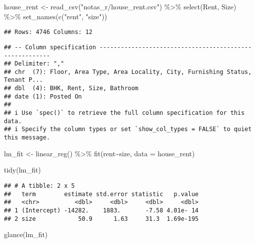 \documentclass[
]{article}
\newenvironment{Shaded}{\begin{snugshade}}{\end{snugshade}}
\newcommand{\AttributeTok}[1]{\textcolor[rgb]{0.77,0.63,0.00}{#1}}
\newcommand{\FunctionTok}[1]{\textcolor[rgb]{0.00,0.00,0.00}{#1}}
\newcommand{\NormalTok}[1]{#1}
\newcommand{\OtherTok}[1]{\textcolor[rgb]{0.56,0.35,0.01}{#1}}
\newcommand{\SpecialCharTok}[1]{\textcolor[rgb]{0.00,0.00,0.00}{#1}}
\newcommand{\StringTok}[1]{\textcolor[rgb]{0.31,0.60,0.02}{#1}}
\begin{document}
\begin{Shaded}
\begin{Highlighting}[]
\NormalTok{house\_rent }\OtherTok{\textless{}{-}} 
  \FunctionTok{read\_csv}\NormalTok{(}\StringTok{"notas\_r/house\_rent.csv"}\NormalTok{) }\SpecialCharTok{\%\textgreater{}\%} 
  \FunctionTok{select}\NormalTok{(Rent, Size) }\SpecialCharTok{\%\textgreater{}\%} 
  \FunctionTok{set\_names}\NormalTok{(}\FunctionTok{c}\NormalTok{(}\StringTok{"rent"}\NormalTok{, }\StringTok{"size"}\NormalTok{))}
\end{Highlighting}
\end{Shaded}

\begin{verbatim}
## Rows: 4746 Columns: 12
\end{verbatim}

\begin{verbatim}
## -- Column specification --------------------------------------------------------
## Delimiter: ","
## chr  (7): Floor, Area Type, Area Locality, City, Furnishing Status, Tenant P...
## dbl  (4): BHK, Rent, Size, Bathroom
## date (1): Posted On
## 
## i Use `spec()` to retrieve the full column specification for this data.
## i Specify the column types or set `show_col_types = FALSE` to quiet this message.
\end{verbatim}

\begin{Shaded}
\begin{Highlighting}[]
\NormalTok{lm\_fit }\OtherTok{\textless{}{-}} 
  \FunctionTok{linear\_reg}\NormalTok{() }\SpecialCharTok{\%\textgreater{}\%} 
  \FunctionTok{fit}\NormalTok{(rent}\SpecialCharTok{\textasciitilde{}}\NormalTok{size, }\AttributeTok{data =}\NormalTok{ house\_rent)}

\FunctionTok{tidy}\NormalTok{(lm\_fit)}
\end{Highlighting}
\end{Shaded}

\begin{verbatim}
## # A tibble: 2 x 5
##   term        estimate std.error statistic   p.value
##   <chr>          <dbl>     <dbl>     <dbl>     <dbl>
## 1 (Intercept) -14282.    1883.       -7.58 4.01e- 14
## 2 size            50.9      1.63     31.3  1.69e-195
\end{verbatim}

\begin{Shaded}
\begin{Highlighting}[]
\FunctionTok{glance}\NormalTok{(lm\_fit)}
\end{Highlighting}
\end{Shaded}
\end{document}
